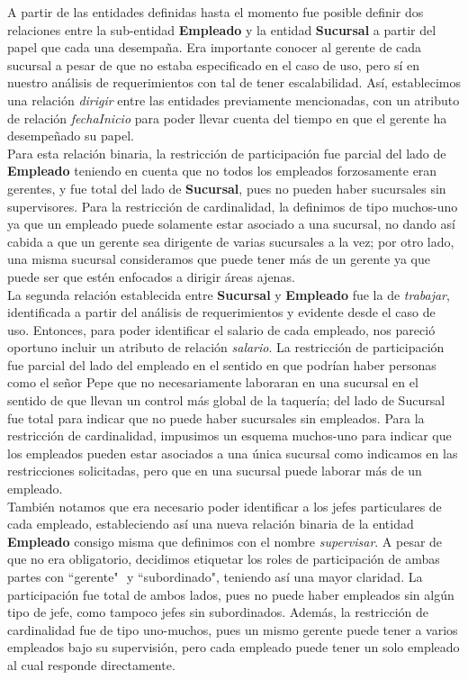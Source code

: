 \documentclass[11pt,letterpaper]{article}
\begin{document}
\newpage
A partir de las entidades definidas hasta el momento fue posible definir dos relaciones entre la sub-entidad \textbf{Empleado} y la entidad \textbf{Sucursal} a partir del papel que cada una desempaña. Era importante conocer al gerente de cada sucursal a pesar de que no estaba especificado en el caso de uso, pero sí en nuestro análisis de requerimientos con tal de tener escalabilidad. Así, establecimos una relación \textit{dirigir} entre las entidades previamente mencionadas, con un atributo de relación \textit{fechaInicio} para poder llevar cuenta del tiempo en que el gerente ha desempeñado su papel. \\

Para esta relación binaria, la restricción de participación fue parcial del lado de \textbf{Empleado} teniendo en cuenta que no todos los empleados forzosamente eran gerentes, y fue total del lado de \textbf{Sucursal}, pues no pueden haber sucursales sin supervisores. Para la restricción de cardinalidad, la definimos de tipo muchos-uno ya que un empleado puede solamente estar asociado a una sucursal, no dando así cabida a que un gerente sea dirigente de varias sucursales a la vez; por otro lado, una misma sucursal consideramos que puede tener más de un gerente ya que puede ser que estén enfocados a dirigir áreas ajenas.\\

La segunda relación establecida entre \textbf{Sucursal} y \textbf{Empleado} fue la de \textit{trabajar}, identificada a partir del análisis de requerimientos y evidente desde el caso de uso. Entonces, para poder identificar el salario de cada empleado, nos pareció oportuno incluir un atributo de relación \textit{salario}. La restricción de participación fue parcial del lado del empleado en el sentido en que podrían haber personas como  el señor Pepe que no necesariamente laboraran en una sucursal en el sentido de que llevan un control más global de la taquería; del lado de Sucursal fue total para indicar que no puede haber sucursales sin empleados. Para la restricción de cardinalidad, impusimos un esquema muchos-uno para indicar que los empleados pueden estar asociados a una única sucursal como indicamos en las restricciones solicitadas, pero que en una sucursal puede laborar más de un empleado. \\

También notamos que era necesario poder identificar a los jefes particulares de cada empleado, estableciendo así una nueva relación binaria de la entidad \textbf{Empleado} consigo misma que definimos con el nombre \textit{supervisar}. A pesar de que no era obligatorio, decidimos etiquetar los roles de participación de ambas partes con ``gerente"\,\, y ``subordinado", teniendo así una mayor claridad. La participación fue total de ambos lados, pues no puede haber empleados sin algún tipo de jefe, como tampoco jefes sin subordinados. Además, la restricción de cardinalidad fue de tipo uno-muchos, pues un mismo gerente puede tener a varios empleados bajo su supervisión, pero cada empleado puede tener un solo empleado al cual responde directamente.\\
\end{document}
